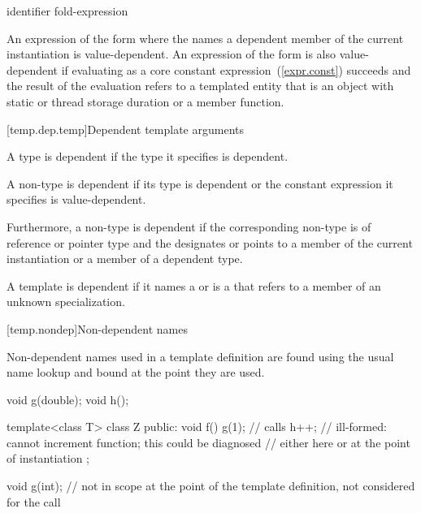 \begin{ncbnftab}
  \terminal{(} identifier \terminal{)}\br
fold-expression
\end{ncbnftab}

\pnum
An expression of the form \tcode{\&} where the
 names a dependent member of the current
instantiation is value-dependent.
An expression of the form \tcode{\&}
is also value-dependent if evaluating 
as a core constant expression~(\ref{expr.const}) succeeds and
the result of the evaluation refers to a templated entity
that is an object with static or thread storage duration or a member function.

[temp.dep.temp]{Dependent template arguments}

\pnum
A type
is dependent if the type it specifies is dependent.

\pnum
A non-type
is dependent if its type is dependent or the constant
expression it specifies is value-dependent.

\pnum
Furthermore, a non-type
is dependent if the corresponding non-type 
is of reference or pointer type and the 
designates or points to a member of the current instantiation or a member of
a dependent type.

\pnum
A template
is dependent if it names a
or is a
that refers to a member of an unknown specialization.

[temp.nondep]{Non-dependent names}

\pnum
Non-dependent names used in a template definition are found using the
usual name lookup and bound at the point they are used.
\begin{example}

\begin{codeblock}
void g(double);
void h();

template<class T> class Z {
public:
  void f() {
    g(1);           // calls 
    h++;            // ill-formed: cannot increment function; this could be diagnosed
                    // either here or at the point of instantiation
  }
};

void g(int);        // not in scope at the point of the template definition, not considered for the call 
\end{codeblock}
\end{example}

